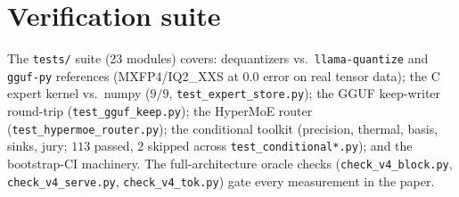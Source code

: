\documentclass[11pt]{article}
\newcommand{\code}[1]{\texttt{#1}}
\begin{document}
\section{Verification suite}
\label{app:verify}

The \code{tests/} suite (23 modules) covers: dequantizers vs.\ \code{llama-quantize}
and \code{gguf-py} references (MXFP4/IQ2\_XXS at $0.0$ error on real tensor data);
the C expert kernel vs.\ numpy ($9/9$, \code{test\_expert\_store.py}); the GGUF
keep-writer round-trip (\code{test\_gguf\_keep.py}); the HyperMoE router
(\code{test\_hypermoe\_router.py}); the conditional toolkit (precision, thermal,
basis, sinks, jury; $113$ passed, $2$ skipped across
\code{test\_conditional*.py}); and the bootstrap-CI machinery. The full-architecture
oracle checks (\code{check\_v4\_block.py}, \code{check\_v4\_serve.py},
\code{check\_v4\_tok.py}) gate every measurement in the paper.
\end{document}
